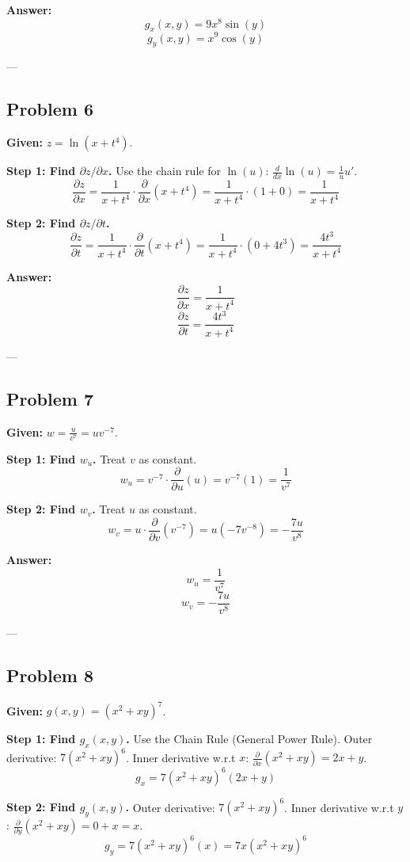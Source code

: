 \documentclass{article}
\begin{document}
\textbf{Answer:}
\[ g_x(x, y) = 9x^8 \sin(y) \]
\[ g_y(x, y) = x^9 \cos(y) \]

---

\subsection*{Problem 6}
\textbf{Given:} $z = \ln(x + t^4)$.

\textbf{Step 1: Find $\partial z / \partial x$.}
Use the chain rule for $\ln(u)$: $\frac{d}{dx}\ln(u) = \frac{1}{u} u'$.
\[ \frac{\partial z}{\partial x} = \frac{1}{x + t^4} \cdot \frac{\partial}{\partial x}(x + t^4) = \frac{1}{x + t^4} \cdot (1 + 0) = \frac{1}{x + t^4} \]

\textbf{Step 2: Find $\partial z / \partial t$.}
\[ \frac{\partial z}{\partial t} = \frac{1}{x + t^4} \cdot \frac{\partial}{\partial t}(x + t^4) = \frac{1}{x + t^4} \cdot (0 + 4t^3) = \frac{4t^3}{x + t^4} \]

\textbf{Answer:}
\[ \frac{\partial z}{\partial x} = \frac{1}{x + t^4} \]
\[ \frac{\partial z}{\partial t} = \frac{4t^3}{x + t^4} \]

---

\subsection*{Problem 7}
\textbf{Given:} $w = \frac{u}{v^7} = u v^{-7}$.

\textbf{Step 1: Find $w_u$.}
Treat $v$ as constant.
\[ w_u = v^{-7} \cdot \frac{\partial}{\partial u}(u) = v^{-7} (1) = \frac{1}{v^7} \]

\textbf{Step 2: Find $w_v$.}
Treat $u$ as constant.
\[ w_v = u \cdot \frac{\partial}{\partial v}(v^{-7}) = u (-7 v^{-8}) = -\frac{7u}{v^8} \]

\textbf{Answer:}
\[ w_u = \frac{1}{v^7} \]
\[ w_v = -\frac{7u}{v^8} \]

---

\subsection*{Problem 8}
\textbf{Given:} $g(x, y) = (x^2 + xy)^7$.

\textbf{Step 1: Find $g_x(x, y)$.}
Use the Chain Rule (General Power Rule).
Outer derivative: $7(x^2 + xy)^6$.
Inner derivative w.r.t $x$: $\frac{\partial}{\partial x}(x^2 + xy) = 2x + y$.
\[ g_x = 7(x^2 + xy)^6 (2x + y) \]

\textbf{Step 2: Find $g_y(x, y)$.}
Outer derivative: $7(x^2 + xy)^6$.
Inner derivative w.r.t $y$: $\frac{\partial}{\partial y}(x^2 + xy) = 0 + x = x$.
\[ g_y = 7(x^2 + xy)^6 (x) = 7x(x^2 + xy)^6 \]
\end{document}

